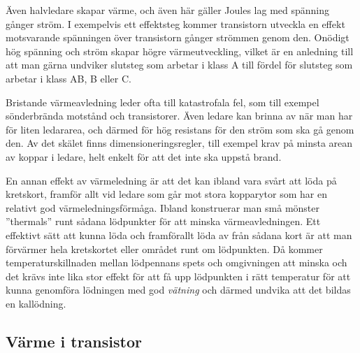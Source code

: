 
Även halvledare skapar värme, och även här gäller Joules lag med spänning
gånger ström. I exempelvis ett effektsteg kommer transistorn utveckla en
effekt motsvarande spänningen över transistorn gånger strömmen genom den. 
Onödigt hög spänning och ström skapar högre värmeutveckling, vilket är en 
anledning till att man gärna undviker slutsteg som arbetar i klass A till fördel för
slutsteg som arbetar i klass AB, B eller C.

Bristande värmeavledning leder ofta till katastrofala fel, som till exempel
sönderbrända motstånd och transistorer. Även ledare kan brinna av när man
har för liten ledararea, och därmed för hög resistans för den ström som
ska gå genom den. Av det skälet finns dimensioneringsregler, till exempel
krav på minsta arean av koppar i ledare, helt enkelt för att det inte ska
uppstå brand.

En annan effekt av värmeledning är att det kan ibland vara svårt att löda på
kretskort, framför allt vid ledare som går mot stora kopparytor som har en
relativt god värmeledningsförmåga. Ibland konstruerar man små mönster
''thermals'' runt sådana lödpunkter för att minska värmeavledningen. Ett
effektivt sätt att kunna löda och framförallt löda av från sådana kort är att
man förvärmer hela kretskortet eller området runt om lödpunkten. Då kommer
temperaturskillnaden mellan lödpennans spets och omgivningen att minska och det
krävs inte lika stor effekt för att få upp lödpunkten i rätt temperatur för att
kunna genomföra lödningen med god \emph{vätning} och därmed undvika att det
bildas en kallödning.

\subsection{Värme i transistor}

